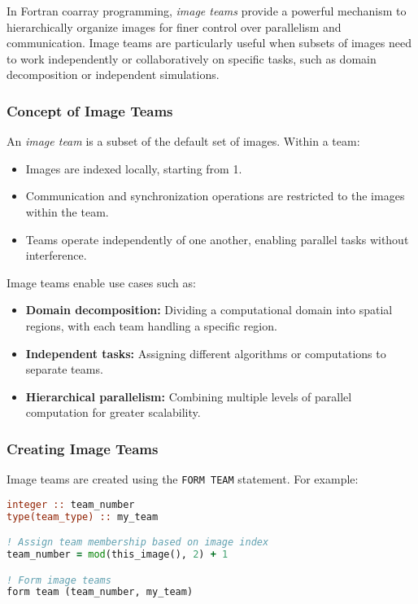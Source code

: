 In Fortran coarray programming, \emph{image teams} provide a powerful mechanism to hierarchically organize images for finer control over parallelism and communication. Image teams are particularly useful when subsets of images need to work independently or collaboratively on specific tasks, such as domain decomposition or independent simulations.

\subsubsection{Concept of Image Teams}

An \emph{image team} is a subset of the default set of images. Within a team:
\begin{itemize}
    \item Images are indexed locally, starting from 1.
    \item Communication and synchronization operations are restricted to the images within the team.
    \item Teams operate independently of one another, enabling parallel tasks without interference.
\end{itemize}

Image teams enable use cases such as:
\begin{itemize}
    \item \textbf{Domain decomposition:} Dividing a computational domain into spatial regions, with each team handling a specific region.
    \item \textbf{Independent tasks:} Assigning different algorithms or computations to separate teams.
    \item \textbf{Hierarchical parallelism:} Combining multiple levels of parallel computation for greater scalability.
\end{itemize}

\subsubsection{Creating Image Teams}

Image teams are created using the \lstinline{FORM TEAM} statement. For example:
\begin{lstlisting}[language=Fortran, style=fortran, caption={Forming image teams}]
integer :: team_number
type(team_type) :: my_team

! Assign team membership based on image index
team_number = mod(this_image(), 2) + 1

! Form image teams
form team (team_number, my_team)
\end{lstlisting}

